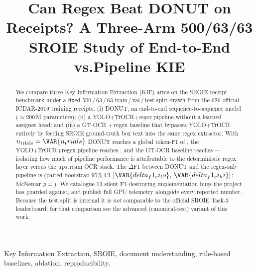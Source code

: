\documentclass[conference]{IEEEtran}
\begin{document}
\title{Can Regex Beat DONUT on Receipts?
       A Three-Arm 500/63/63 SROIE Study of
       End-to-End vs.\@ Pipeline KIE}

\author{
}

\maketitle

\begin{IEEEkeywords}
Key Information Extraction, SROIE, document understanding,
rule-based baselines, ablation, reproducibility.
\end{IEEEkeywords}

\begin{abstract}
We compare three Key Information Extraction (KIE) arms on the SROIE
receipt benchmark under a fixed 500\,/\,63\,/\,63
train\,/\,val\,/\,test split drawn from the 626 official ICDAR-2019
training receipts: (i) DONUT, an end-to-end sequence-to-sequence
model ($\approx$200\,M parameters); (ii) a YOLO+TrOCR+\emph{regex}
pipeline without a learned assigner head; and (iii) a GT-OCR
$+$\,regex baseline that bypasses YOLO+TrOCR entirely by feeding
SROIE ground-truth box text into the same regex extractor.  With
$n_{\text{trials}}=\VAR{n_trials}$ DONUT reaches a global
token-F1 of , the YOLO+TrOCR+regex
pipeline reaches , and the GT-OCR
baseline reaches  —
isolating how much of pipeline performance is attributable to the
deterministic regex layer versus the upstream OCR stack.  The
$\Delta$F1 between DONUT and the regex-only pipeline is
 (paired-bootstrap 95\% CI
$[\VAR{delta_f1_ci_lo},\,\VAR{delta_f1_ci_hi}]$;
McNemar $p=$).  We catalogue
13 silent F1-destroying implementation bugs the project has guarded
against, and publish full GPU telemetry alongside every reported
number.  Because the test split is internal it is \emph{not}
comparable to the official SROIE Task-3 leaderboard; for that
comparison see the advanced (canonical-test) variant of this work.
\end{abstract}



















\end{document}
